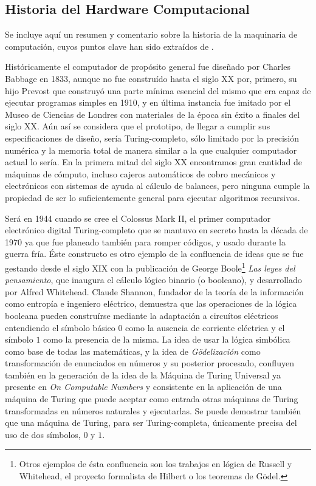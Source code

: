 \documentclass[12pt]{memoir}
\begin{document}
\begin{appendices}

\chapter{Historia del Hardware Computacional}
\label{compHis}

Se incluye aquí un resumen y comentario sobre la historia de la maquinaria de computación, cuyos puntos clave han sido extraídos de \parencite{wiki:computerhistory}.

Históricamente el computador de propósito general fue diseñado por Charles Babbage en 1833, aunque no fue construído hasta el siglo XX por, primero, su hijo Prevost que construyó una parte mínima esencial del mismo que era capaz de ejecutar programas simples en 1910, y en última instancia fue imitado por el Museo de Ciencias de Londres con materiales de la época sin éxito a finales del siglo XX. Aún así se considera que el prototipo, de llegar a cumplir sus especificaciones de diseño, sería Turing-completo, sólo limitado por la precisión numérica y la memoria total de manera similar a la que cualquier computador actual lo sería. En la primera mitad del siglo XX encontramos gran cantidad de máquinas de cómputo, incluso cajeros automáticos de cobro mecánicos y electrónicos con sistemas de ayuda al cálculo de balances, pero ninguna cumple la propiedad de ser lo suficientemente general para ejecutar algoritmos recursivos.

Será en 1944 cuando se cree el Colossus Mark II, el primer computador electrónico digital Turing-completo que se mantuvo en secreto hasta la década de 1970 ya que fue planeado también para romper códigos, y usado durante la guerra fría. Éste constructo es otro ejemplo de la confluencia de ideas que se fue gestando desde el siglo XIX con la publicación de George Boole\footnote{Otros ejemplos de ésta confluencia son los trabajos en lógica de Russell y Whitehead, el proyecto formalista de Hilbert o los teoremas de Gödel.} \textit{Las leyes del pensamiento}, que inaugura el cálculo lógico binario (o booleano), y desarrollado por Alfred Whitehead. Claude Shannon, fundador de la teoría de la información como entropía e ingeniero eléctrico, demuestra que las operaciones de la lógica booleana pueden construírse mediante la adaptación a circuítos eléctricos entendiendo el símbolo básico $0$ como la ausencia de corriente eléctrica y el símbolo $1$ como la presencia de la misma. La idea de usar la lógica simbólica como base de todas las matemáticas, y la idea de \textit{Gödelización} como transformación de enunciados en números y su posterior procesado, confluyen también en la generación de la idea de la Máquina de Turing Universal ya presente en \textit{On Computable Numbers} y consistente en la aplicación de una máquina de Turing que puede aceptar como entrada otras máquinas de Turing transformadas en números naturales y ejecutarlas. Se puede demostrar también que una máquina de Turing, para ser Turing-completa, únicamente precisa del uso de dos símbolos, $0$ y $1$. 


\end{appendices}
\end{document}
